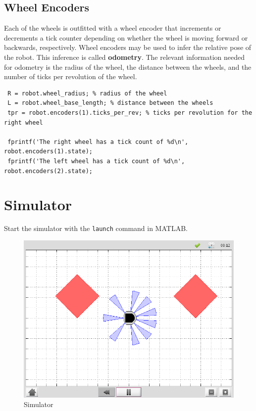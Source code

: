\documentclass[10pt]{article}
\begin{document}
\subsection*{Wheel Encoders}
Each of the wheels is outfitted with a wheel encoder that increments or decrements a tick counter depending on whether the wheel is moving forward or backwards, respectively. Wheel encoders may be used to infer the relative pose of the robot. This inference is called \textbf{odometry}. The relevant information needed for odometry is the radius of the wheel, the distance between the wheels, and the number of ticks per revolution of the wheel.

\begin{verbatim}
 R = robot.wheel_radius; % radius of the wheel
 L = robot.wheel_base_length; % distance between the wheels
 tpr = robot.encoders(1).ticks_per_rev; % ticks per revolution for the right wheel

 fprintf('The right wheel has a tick count of %d\n', robot.encoders(1).state);
 fprintf('The left wheel has a tick count of %d\n', robot.encoders(2).state);
\end{verbatim}

\section*{Simulator}

Start the simulator with the \texttt{launch} command in MATLAB.

\begin{figure}
 \centering
 \includegraphics[scale=0.35]{simiam.png}
 \caption{Simulator}
 \label{fig:k3_sim}
\end{figure}
\end{document}
